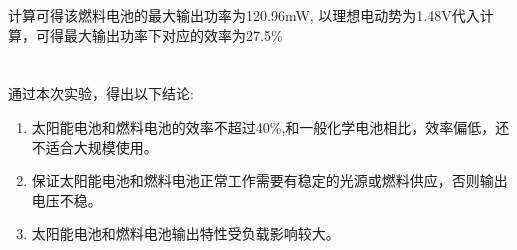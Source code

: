 ﻿\documentclass[10.5pt]{article}
\begin{document}
计算可得该燃料电池的最大输出功率为120.96mW,
以理想电动势为1.48V代入计算，可得最大输出功率下对应的效率为27.5\%




\subsection{\textbf{}}

\section{\textbf{}}

通过本次实验，得出以下结论:
\begin{enumerate}
\item 太阳能电池和燃料电池的效率不超过40\%,和一般化学电池相比，效率偏低，还不适合大规模使用。
\item 保证太阳能电池和燃料电池正常工作需要有稳定的光源或燃料供应，否则输出电压不稳。
\item 太阳能电池和燃料电池输出特性受负载影响较大。
\end{enumerate}
\end{document}
